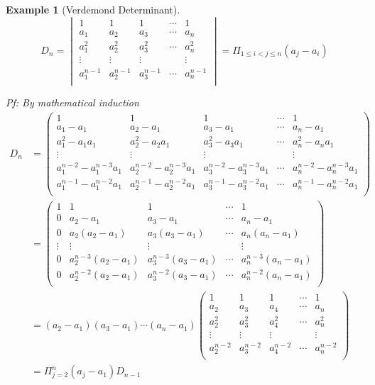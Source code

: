 \documentclass[onecolumn]{ctexart}
\newtheorem{example}{Example}
\begin{document}
\begin{example}[Verdemond Determinant]
\[
  D_n = 
  \begin{vmatrix}
    1 & 1 & 1 & \cdots & 1 \\
    a_1 & a_2 & a_3 & \cdots & a_n \\
    a_1^2 & a_2^2 & a_3^2 & \cdots & a_n^2 \\
    \vdots & \vdots & \vdots & & \vdots \\
    a_1^{n-1} & a_2^{n-1} & a_3^{n-1} & \cdots & a_n^{n-1} \\
  \end{vmatrix} = \Pi_{1 \leq i < j \leq n} (a_j - a_i)
\]

Pf: By mathematical induction
\[
  \begin{split}
    D_n &= 
    \begin{pmatrix}
      1 & 1 & 1 & \cdots & 1 \\
      a_1 - a_1 & a_2 - a_1 & a_3 - a_1 & \cdots & a_n - a_1 \\
      a_1^2 - a_1 a_1 & a_2^2 - a_2 a_1 & a_3^2 - a_3 a_1 & \cdots & a_n^2 - a_n a_1 \\
      \vdots & \vdots & \vdots & & \vdots \\
      a_1^{n-2} - a_1^{n-3}a_1 & a_2^{n-2} - a_2^{n-3}a_1 & a_3^{n-2} - a_3^{n-3}a_1 & \cdots & a_n^{n-2} - a_n^{n-3}a_1 \\
      a_1^{n-1} - a_1^{n-2}a_1 & a_2^{n-1} - a_2^{n-2}a_1 & a_3^{n-1} - a_3^{n-2}a_1 & \cdots & a_n^{n-1} - a_n^{n-2}a_1 \\
    \end{pmatrix} \\
    &=
    \begin{pmatrix}
      1 & 1 & 1 & \cdots & 1 \\
      0 & a_2 - a_1 & a_3 - a_1 & \cdots & a_n - a_1 \\
      0 & a_2(a_2 - a_1) & a_3(a_3 - a_1) & \cdots & a_n(a_n - a_1) \\
      \vdots & \vdots & \vdots & & \vdots \\
      0 & a_2^{n-3}(a_2 - a_1) & a_3^{n-3}(a_3 - a_1) & \cdots & a_n^{n-3}(a_n - a_1) \\
      0 & a_2^{n-2}(a_2 - a_1) & a_3^{n-2}(a_3 - a_1) & \cdots & a_n^{n-2}(a_n - a_1) \\     
    \end{pmatrix} \\
    &= (a_2 - a_1)(a_3 - a_1)\cdots(a_n - a_1)
    \begin{pmatrix}
      1 & 1 & 1 & \cdots & 1 \\
      a_2 & a_3 & a_4 & \cdots & a_n \\
      a_2^2 & a_3^2 & a_4^2 & \cdots & a_n^2 \\
      \vdots & \vdots & \vdots & & \vdots \\
      a_2^{n-2} & a_3^{n-2} & a_4^{n-2} & \cdots & a_n^{n-2} \\ 
    \end{pmatrix} \\
    &= \Pi_{j = 2}^n(a_j - a_1)D_{n-1}
  \end{split}
\]
\end{example}
\end{document}
